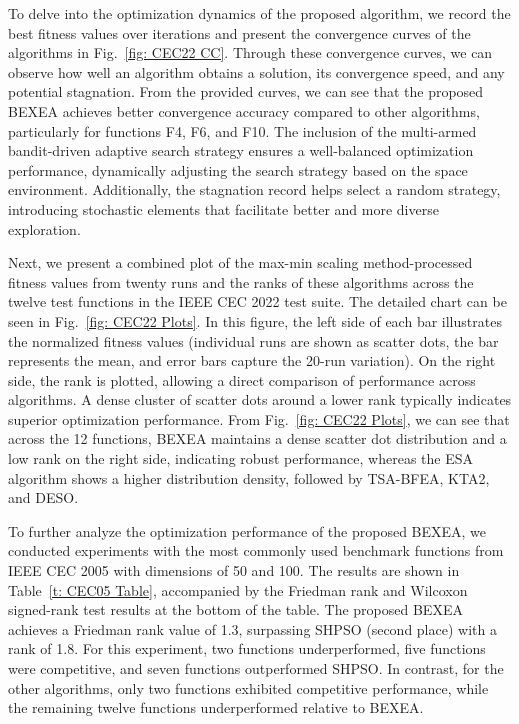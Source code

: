 \documentclass[review]{elsarticle}
\begin{document}
To delve into the optimization dynamics of the proposed algorithm, we record the best fitness values over iterations and present the convergence curves of the algorithms in Fig.~\ref{fig: CEC22 CC}. Through these convergence curves, we can observe how well an algorithm obtains a solution, its convergence speed, and any potential stagnation. From the provided curves, we can see that the proposed BEXEA achieves better convergence accuracy compared to other algorithms, particularly for functions F4, F6, and F10. The inclusion of the multi-armed bandit-driven adaptive search strategy ensures a well-balanced optimization performance, dynamically adjusting the search strategy based on the space environment. Additionally, the stagnation record helps select a random strategy, introducing stochastic elements that facilitate better and more diverse exploration.

Next, we present a combined plot of the max-min scaling method-processed fitness values from twenty runs and the ranks of these algorithms across the twelve test functions in the IEEE CEC 2022 test suite. The detailed chart can be seen in Fig.~\ref{fig: CEC22 Plots}. In this figure, the left side of each bar illustrates the normalized fitness values (individual runs are shown as scatter dots, the bar represents the mean, and error bars capture the 20-run variation). On the right side, the rank is plotted, allowing a direct comparison of performance across algorithms. A dense cluster of scatter dots around a lower rank typically indicates superior optimization performance. From Fig.~\ref{fig: CEC22 Plots}, we can see that across the 12 functions, BEXEA maintains a dense scatter dot distribution and a low rank on the right side, indicating robust performance, whereas the ESA algorithm shows a higher distribution density, followed by TSA-BFEA, KTA2, and DESO.

To further analyze the optimization performance of the proposed BEXEA, we conducted experiments with the most commonly used benchmark functions from IEEE CEC 2005 with dimensions of 50 and 100. The results are shown in Table~\ref{t: CEC05 Table}, accompanied by the Friedman rank and Wilcoxon signed-rank test results at the bottom of the table. The proposed BEXEA achieves a Friedman rank value of 1.3, surpassing SHPSO (second place) with a rank of 1.8. For this experiment, two functions underperformed, five functions were competitive, and seven functions outperformed SHPSO. In contrast, for the other algorithms, only two functions exhibited competitive performance, while the remaining twelve functions underperformed relative to BEXEA.
\end{document}
